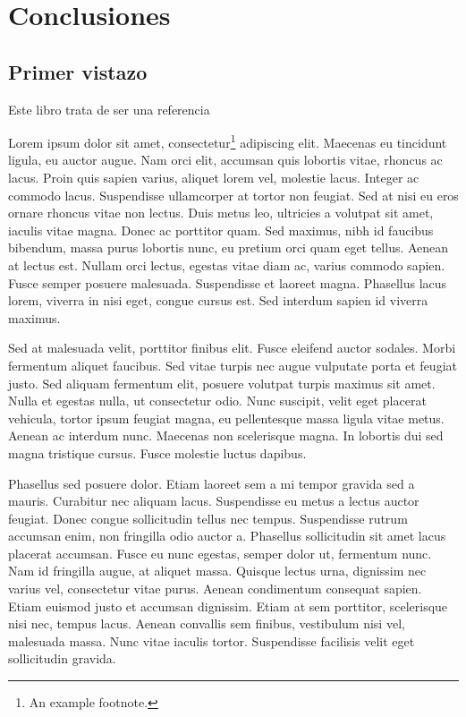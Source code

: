 \chapter{Conclusiones}
\section{Primer vistazo}
Este libro trata de ser una referencia



Lorem ipsum dolor sit amet, consectetur\footnote{An example footnote.} adipiscing elit. Maecenas eu tincidunt ligula, eu auctor augue. Nam orci elit, accumsan quis lobortis vitae, rhoncus ac lacus. Proin quis sapien varius, aliquet lorem vel, molestie lacus. Integer ac commodo lacus. Suspendisse ullamcorper at tortor non feugiat. Sed at nisi eu eros ornare rhoncus vitae non lectus. Duis metus leo, ultricies a volutpat sit amet, iaculis vitae magna. Donec ac porttitor quam. Sed maximus, nibh id faucibus bibendum, massa purus lobortis nunc, eu pretium orci quam eget tellus. Aenean at lectus est. Nullam orci lectus, egestas vitae diam ac, varius commodo sapien. Fusce semper posuere malesuada. Suspendisse et laoreet magna. Phasellus lacus lorem, viverra in nisi eget, congue cursus est. Sed interdum sapien id viverra maximus.

Sed at malesuada velit, porttitor finibus elit. Fusce eleifend auctor sodales. Morbi fermentum aliquet faucibus. Sed vitae turpis nec augue vulputate porta et feugiat justo. Sed aliquam fermentum elit, posuere volutpat turpis maximus sit amet. Nulla et egestas nulla, ut consectetur odio. Nunc suscipit, velit eget placerat vehicula, tortor ipsum feugiat magna, eu pellentesque massa ligula vitae metus. Aenean ac interdum nunc. Maecenas non scelerisque magna. In lobortis dui sed magna tristique cursus. Fusce molestie luctus dapibus.

Phasellus sed posuere dolor. Etiam laoreet sem a mi tempor gravida sed a mauris. Curabitur nec aliquam lacus. Suspendisse eu metus a lectus auctor feugiat. Donec congue sollicitudin tellus nec tempus. Suspendisse rutrum accumsan enim, non fringilla odio auctor a. Phasellus sollicitudin sit amet lacus placerat accumsan. Fusce eu nunc egestas, semper dolor ut, fermentum nunc. Nam id fringilla augue, at aliquet massa. Quisque lectus urna, dignissim nec varius vel, consectetur vitae purus. Aenean condimentum consequat sapien. Etiam euismod justo et accumsan dignissim. Etiam at sem porttitor, scelerisque nisi nec, tempus lacus. Aenean convallis sem finibus, vestibulum nisi vel, malesuada massa. Nunc vitae iaculis tortor. Suspendisse facilisis velit eget sollicitudin gravida.

